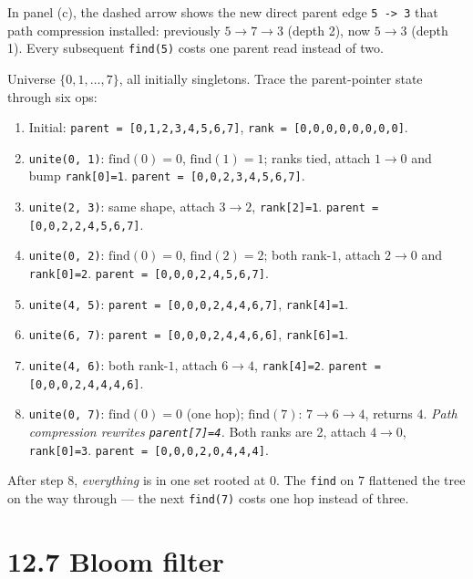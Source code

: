 \documentclass[11pt]{article}
\begin{document}
In panel (c), the dashed arrow shows the new direct parent edge
\texttt{5 -> 3} that path compression installed: previously $5 \to
7 \to 3$ (depth 2), now $5 \to 3$ (depth 1). Every subsequent
\texttt{find(5)} costs one parent read instead of two.

\begin{examplebox}
Universe $\{0, 1, \ldots, 7\}$, all initially singletons. Trace
the parent-pointer state through six ops:

\begin{enumerate}[leftmargin=*]
    \item Initial: \texttt{parent = [0,1,2,3,4,5,6,7]},
          \texttt{rank = [0,0,0,0,0,0,0,0]}.
    \item \texttt{unite(0, 1)}: $\text{find}(0)=0$,
          $\text{find}(1)=1$; ranks tied, attach $1 \to 0$ and
          bump \texttt{rank[0]=1}.
          \texttt{parent = [0,0,2,3,4,5,6,7]}.
    \item \texttt{unite(2, 3)}: same shape, attach $3 \to 2$,
          \texttt{rank[2]=1}.
          \texttt{parent = [0,0,2,2,4,5,6,7]}.
    \item \texttt{unite(0, 2)}: $\text{find}(0)=0$,
          $\text{find}(2)=2$; both rank-$1$, attach $2 \to 0$ and
          \texttt{rank[0]=2}.
          \texttt{parent = [0,0,0,2,4,5,6,7]}.
    \item \texttt{unite(4, 5)}: \texttt{parent = [0,0,0,2,4,4,6,7]},
          \texttt{rank[4]=1}.
    \item \texttt{unite(6, 7)}: \texttt{parent = [0,0,0,2,4,4,6,6]},
          \texttt{rank[6]=1}.
    \item \texttt{unite(4, 6)}: both rank-$1$, attach $6 \to 4$,
          \texttt{rank[4]=2}.
          \texttt{parent = [0,0,0,2,4,4,4,6]}.
    \item \texttt{unite(0, 7)}: $\text{find}(0)=0$ (one hop);
          $\text{find}(7)$: $7 \to 6 \to 4$, returns $4$.
          \emph{Path compression rewrites
          \texttt{parent[7]=4}.}
          Both ranks are 2, attach $4 \to 0$, \texttt{rank[0]=3}.
          \texttt{parent = [0,0,0,2,0,4,4,4]}.
\end{enumerate}

After step 8, \emph{everything} is in one set rooted at $0$. The
\texttt{find} on $7$ flattened the tree on the way through ---
the next \texttt{find(7)} costs one hop instead of three.
\end{examplebox}

\section{12.7 Bloom filter}
\end{document}
